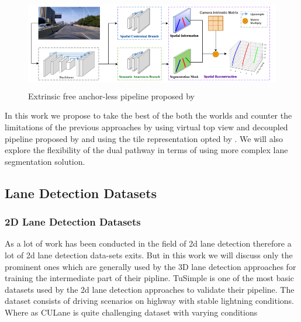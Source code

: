 \begin{figure}[h]
    \centering
\includegraphics[width=12cm, height=4cm]{images/once_pipeline.png}
    \caption{Extrinsic free anchor-less pipeline proposed by \cite{yan2022once}}
    \end{figure}

In this work we propose to take the best of the both the worlds and counter the limitations of the previous approaches by using virtual top view and decoupled pipeline proposed by \cite{guo2020gen} and using the tile representation opted by \cite{DBLP:journals/corr/abs-2011-01535}. We will also explore the flexibility of the dual pathway in terms of using more complex lane segmentation solution.

\subsection{Lane Detection Datasets}

\subsubsection{2D Lane Detection Datasets}
As a lot of work has been conducted in the field of 2d lane detection therefore a lot of 2d lane detection data-sets exits. But in this work we will discuss only the prominent ones which are generally used by the 3D lane detection approaches for training the intermediate part of their pipline. \cite{} TuSimple is one of the most basic datasets used by the 2d lane detection approaches to validate their pipeline. The dataset consists of driving scenarios on highway with stable lightning conditions. Where as CULane \cite{} is quite challenging dataset with varying conditions 



